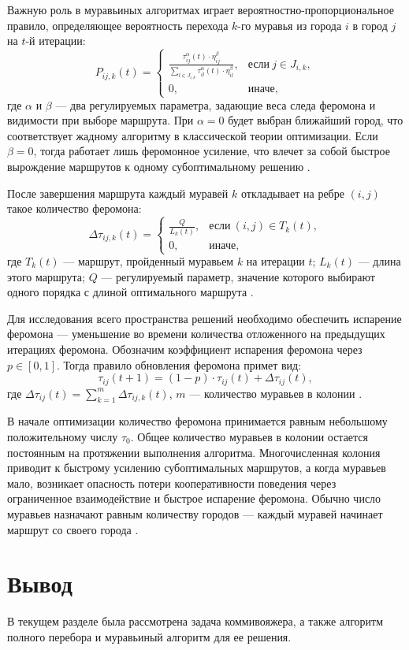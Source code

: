 Важную роль в муравьиных алгоритмах играет вероятностно-пропорциональное правило, определяющее вероятность перехода $k$-го муравья из города $i$ в город $j$ на $t$-й итерации:
\begin{equation}
P_{ij,k}(t) = 
\begin{cases}
\frac{\tau^\alpha_{ij}(t) \cdot \eta^\beta_{ij}}{\displaystyle\sum_{l \in J_{i,k}}^{} \tau^\alpha_{il}(t) \cdot \eta^\beta_{il}}, & \text{если}~j \in J_{i,k}, \\
0, & \text{иначе},
\end{cases}
\end{equation}
где $\alpha$ и $\beta$ --- два регулируемых параметра, задающие веса следа феромона и видимости при выборе маршрута. 
При $\alpha = 0$ будет выбран ближайший город, что соответствует жадному алгоритму в классической теории оптимизации. 
Если $\beta = 0$, тогда работает лишь феромонное усиление, что влечет за собой быстрое вырождение маршрутов к одному субоптимальному решению \cite{Shtovba2003}.

После завершения маршрута каждый муравей $k$ откладывает на ребре $(i, j)$ такое количество феромона:
\begin{equation}
\Delta \tau_{ij,k}(t) = 
\begin{cases}
\frac{Q}{L_{k}(t)}, & \text{если}~(i, j) \in T_{k}(t), \\
0, & \text{иначе},
\end{cases}
\end{equation}
где $T_{k}(t)$ --- маршрут, пройденный муравьем $k$ на итерации $t$; $L_{k}(t)$ --- длина этого маршрута; $Q$ --- регулируемый параметр, значение которого выбирают одного порядка с длиной оптимального маршрута \cite{Shtovba2003}.

Для исследования всего пространства решений необходимо обеспечить испарение феромона --- уменьшение во времени количества отложенного на предыдущих итерациях феромона. 
Обозначим коэффициент испарения феромона через $p \in [0, 1]$. Тогда правило обновления феромона примет вид:
\begin{equation}
\tau_{ij}(t + 1) = (1 - p) \cdot \tau_{ij}(t) + \Delta \tau_{ij}(t),
\end{equation}
где $\Delta \tau_{ij}(t) = \displaystyle\sum_{k = 1}^{m} \Delta \tau_{ij,k}(t)$, $m$ --- количество муравьев в колонии \cite{Shtovba2003}.

В начале оптимизации количество феромона принимается равным небольшому положительному числу $\tau_0$. 
Общее количество муравьев в колонии остается постоянным на протяжении выполнения алгоритма. 
Многочисленная колония приводит к быстрому усилению субоптимальных маршрутов, а когда муравьев мало, возникает опасность потери кооперативности поведения через ограниченное взаимодействие и быстрое испарение феромона. 
Обычно число муравьев назначают равным количеству городов --- каждый муравей начинает маршрут со своего города \cite{Shtovba2003}.

\section*{Вывод}

В текущем разделе была рассмотрена задача коммивояжера, а также алгоритм полного перебора и муравьиный алгоритм для ее решения.